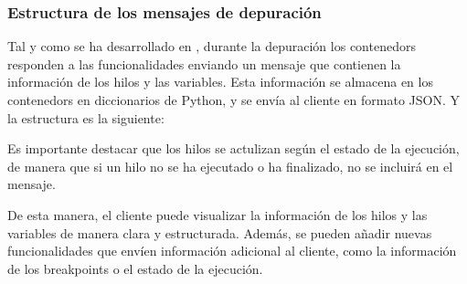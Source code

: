 \FloatBarrier

\subsubsection{Estructura de los mensajes de depuración} \label{subsec:estructura-mensajes-depuracion}
Tal y como se ha desarrollado en , durante la depuración los \glspl{contenedor} responden a las funcionalidades enviando un mensaje que contienen la información de los \glspl{hilo} y las variables. Esta información se almacena en los \glspl{contenedor} en diccionarios de Python, y se envía al cliente en formato \gls{JSON}. Y la estructura es la siguiente:

\begin{figure}[htb]
    {
    \begin{tcolorbox}
    \end{tcolorbox}
    }
\end{figure}

Es importante destacar que los \glspl{hilo} se actulizan según el estado de la ejecución, de manera que si un \gls{hilo} no se ha ejecutado o ha finalizado, no se incluirá en el mensaje.

De esta manera, el cliente puede visualizar la información de los \glspl{hilo} y las variables de manera clara y estructurada. Además, se pueden añadir nuevas funcionalidades que envíen información adicional al cliente, como la información de los \glspl{breakpoint} o el estado de la ejecución.